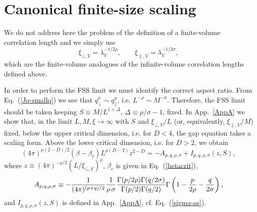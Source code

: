 \documentclass[a4paper,12pt]{article}
\newcommand{\reff}[1]{(\ref{#1})}
\begin{document}
\section{Canonical finite-size scaling} \label{sec3}

We do not address here the problem of the definition of a
finite-volume correlation length and we simply use 
\begin{equation}
   \xi_{\bot,V} = \lambda_V^{-1/2\rho}, \qquad \xi_{\|,V} = 
\lambda_V^{-1/2\sigma},
\end{equation}
which are the finite-volume analogues of the infinite-volume correlation 
lengths defined above.

In order to perform the FSS limit we must identify the correct aspect ratio.
{}From Eq.~(\ref{Jq-smallq}) we see that $q_\bot^\rho\sim q_\|^\sigma$, i.e.
$L^{-\rho} \sim M^{-\sigma}$. Therefore, the FSS limit should be taken 
keeping $S\equiv M/L^{1+\Delta}$, $\Delta \equiv \rho/\sigma - 1$, fixed. 
In App.~\ref{AppA} we show that, in the limit 
$L,M,\xi \to \infty$ with $S$ and $\xi_{\bot,V}/L$ (or, equivalently,
$\xi_{\|,V}/M$)
fixed, below the upper critical dimension,
i.e. for $D < 4$, the gap equation takes a scaling form. 
Above the lower critical dimension, i.e. for $D > 2$, we obtain
\begin{equation}
\label{eq:gap_equation_sconst}
(4\pi)^{\rho(2-D)/2} (\beta-\beta_c)L^{\rho(D-2)} z^{2-D} =
- A_{p,q,\rho,\sigma} + I_{p,q,\rho,\sigma}(z,S),
\end{equation}
where $z\equiv (4\pi)^{-\rho/2} (L/\xi_{\bot,V})^\rho$,
$\beta_c$ is given in Eq.~\reff{betacrit}, 
\begin{equation}
A_{p,q,\rho,\sigma} \equiv - \frac{1}{(4\pi)^{(p+q)/2}}\frac{1}{\rho\,\sigma}
\frac{\Gamma(p/2\rho)\Gamma(q/2\sigma)}{\Gamma(p/2)\Gamma(q/2)} 
   \Gamma\left(1-{p\over 2\rho} - {q\over 2\sigma}\right) ,
\label{def-Apq}
\end{equation}
and $I_{p,q,\rho,\sigma}(z,S)$ is defined in App.~\ref{AppA},
cf. Eq.~(\ref{sigma-as}). 
\end{document}
